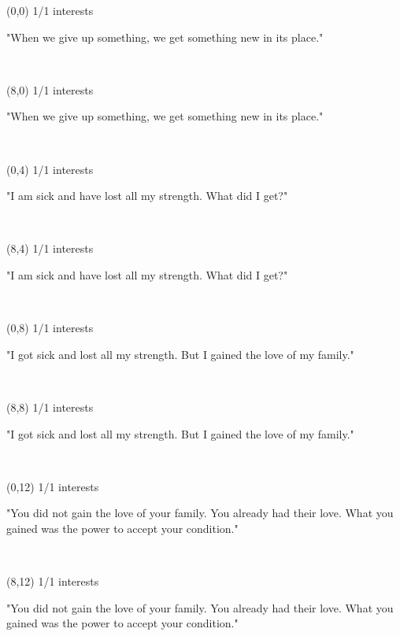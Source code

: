 \documentclass[a4paper]{article}
\newcommand{\mycard}[5]{%
	\vspace{0.1cm}
	\small #1 #2
	\par
	\parbox[t][6.7cm][c]{9.5cm}{%
	\hspace{0.1cm} \Large#3\\
	\normalsize#4 #5
	}
}
\begin{document}
\selectfont

\begin{textblock}{8}(0,0)
\mycard{1/1}{interests}{\parbox{9.0cm}{
"When we give up something, we get something new in its place."
}}{}{} 
\end{textblock}

\begin{textblock}{8}(8,0)
\mycard{1/1}{interests}{\parbox{9.0cm}{
"When we give up something, we get something new in its place."
}}{}{} 
\end{textblock}

\begin{textblock}{8}(0,4)
\mycard{1/1}{interests}{\parbox{9.0cm}{
"I am sick and have lost all my strength. What did I get?"
}}{}{} 
\end{textblock}

\begin{textblock}{8}(8,4)
\mycard{1/1}{interests}{\parbox{9.0cm}{
"I am sick and have lost all my strength. What did I get?"
}}{}{} 
\end{textblock}

\begin{textblock}{8}(0,8)
\mycard{1/1}{interests}{\parbox{9.0cm}{
"I got sick and lost all my strength. But I gained the love of my family."
}}{}{} 
\end{textblock}

\begin{textblock}{8}(8,8)
\mycard{1/1}{interests}{\parbox{9.0cm}{
"I got sick and lost all my strength. But I gained the love of my family."
}}{}{} 
\end{textblock}

\begin{textblock}{8}(0,12)
\mycard{1/1}{interests}{\parbox{9.0cm}{
"You did not gain the love of your family. You already had their love. What you gained was the power to accept your condition."
}}{}{} 
\end{textblock}

\begin{textblock}{8}(8,12)
\mycard{1/1}{interests}{\parbox{9.0cm}{
"You did not gain the love of your family. You already had their love. What you gained was the power to accept your condition."
}}{}{} 
\end{textblock}
\end{document}
